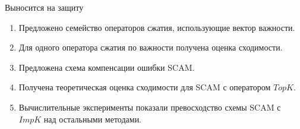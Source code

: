 \documentclass{beamer}
\begin{document}

\begin{frame}{Выносится на защиту}
    \begin{enumerate}
        \item Предложено семейство операторов сжатия, использующие вектор важности.
        \item Для одного оператора сжатия по важности получена оценка сходимости.
        \item Предложена схема компенсации ошибки SCAM.
        \item Получена теоретическая оценка сходимости для SCAM с оператором $TopK$.
        \item Вычислительные эксперименты показали превосходство схемы SCAM с $ImpK$ над остальными методами.
    \end{enumerate}
\end{frame}

\end{document}
